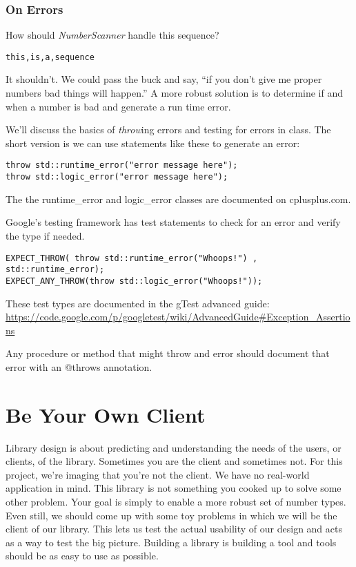 \documentclass[10pt]{article}
\begin{document}
\subsubsection{On Errors}

How should \textit{NumberScanner} handle this sequence?
\begin{verbatim}
this,is,a,sequence
\end{verbatim}
It shouldn't. We could pass the buck and say, ``if you don't give me proper numbers bad things will happen.''  A more robust solution is to determine if and when a number is bad and generate a run time error. 

We'll discuss the basics of \textit{throw}ing errors and testing for errors in class.  	The short version is we can use statements like these to generate an error:
\begin{verbatim}
throw std::runtime_error("error message here");
throw std::logic_error("error message here");
\end{verbatim}
The the runtime\_error and logic\_error classes are documented on cplusplus.com. 

Google's testing framework has test statements to check for an error and verify the type if needed. 
\begin{verbatim}
EXPECT_THROW( throw std::runtime_error("Whoops!") , std::runtime_error);
EXPECT_ANY_THROW(throw std::logic_error("Whoops!"));
\end{verbatim}
These test types are documented in the gTest advanced guide: \url{https://code.google.com/p/googletest/wiki/AdvancedGuide#Exception_Assertions}

Any procedure or method that might throw and error should document that error with an @throws annotation.

\section{Be Your Own Client}

Library design is about predicting and understanding the needs of the users, or clients, of the library.  Sometimes you are the client and sometimes not. For this project, we're imaging that you're not the client. We have no real-world application in mind. This library is not something you cooked up to solve some other problem. Your goal is simply to enable a more robust set of number types. Even still, we should come up with some toy problems in which we will be the client of our library. This lets us test the actual usability of our design and acts as a way to test the big picture.  Building a library is building a tool and tools should be as easy to use as possible. 
\end{document}

